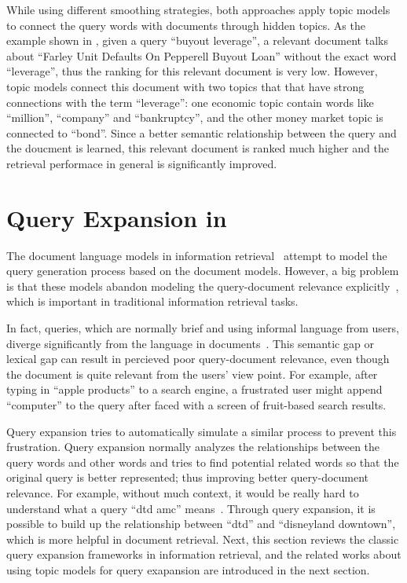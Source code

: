 While using different smoothing strategies, both approaches apply topic models to
connect the query words with documents through hidden topics. As the example shown in
\citet{wei-06}, given a query ``buyout leverage'', a relevant document talks about 
``Farley Unit Defaults On Pepperell Buyout Loan'' without the exact word ``leverage'',
thus the ranking for this relevant document is very low. However, topic models connect
this document with two topics that that have strong connections with the term ``leverage'': 
one economic topic contain words like ``million'', ``company'' and ``bankruptcy'',
and the other money market topic is connected to ``bond''.
Since a better semantic relationship between the query and the doucment is learned,
this relevant document is ranked much higher and the retrieval performace in general is 
significantly improved.


\section{Query Expansion in }

The document language models in information
retrieval~\citep{PonteCroft} attempt to model the query
generation process based on the document models. However, a big
problem is that these models abandon modeling the query-document
relevance explicitly~\citep{Lavrenko-2001}, which is important in
traditional information retrieval tasks.

In fact, queries, which are normally brief and using informal
language from users, diverge significantly from the language in
documents~\citep{Muller-2009}. This semantic gap or lexical gap can
result in percieved poor query-document relevance, even though the document is
quite relevant from the users' view point. For example, after typing
in ``apple products'' to a search engine, a frustrated user might append
``computer'' to the query after faced with a screen of fruit-based
search results.

Query expansion tries to automatically simulate a similar process to
prevent this frustration. Query expansion normally analyzes the
relationships between the query words and other words and tries to
find potential related words so that the original query is better
represented; thus improving better query-document relevance. For
example, without much context, it would be really hard to understand
what a query ``dtd amc'' means~\citep{Jiang-2016}. Through query
expansion, it is possible to build up the relationship between ``dtd''
and ``disneyland downtown'', which is more helpful in document
retrieval.  Next, this section reviews the classic query expansion
frameworks in information retrieval, and the related works about using
topic models for query exapansion are introduced in the next section.

